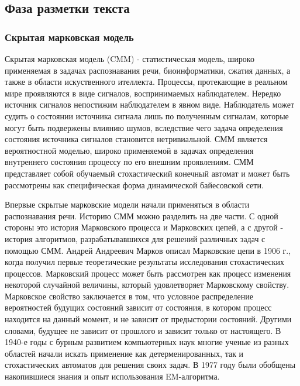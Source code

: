 \subsection{Фаза разметки текста}

\subsubsection{Скрытая марковская модель}
Скрытая марковская модель (CMM) - статистическая модель, широко применяемая в задачах распознавания речи, биоинформатики, сжатия данных, а также в области искуственного ителлекта. Процессы, протекающие в реальном мире проявляются в виде сигналов, воспринимаемых наблюдателем. Нередко источник сигналов непостижим наблюдателем в явном виде. Наблюдатель может судить о состоянии источника сигнала лишь по полученным сигналам, которые могут быть подвержены влиянию шумов, вследствие чего задача определения состояния источника сигналов становится нетривиальной. СММ является вероятностной моделью, широко применяемой в задачах определения внутреннего состояния процессу по его внешним проявлениям. СММ представляет собой обучаемый стохастический конечный автомат и может быть рассмотрены как специфическая форма динамической байесовской сети.

Впервые скрытые марковские модели начали применяться в области распознавания речи. Историю СММ можно разделить на две части.\cite{kouemou} С одной стороны это история Марковского процесса и Марковских цепей, а с другой - история алгоритмов, разрабатывавшихся для решений различных задач с помощью СММ. Андрей Андреевич Марков описал Марковские цепи в 1906 г., когда получил первые теоретические результаты исследования стохастических процессов. Марковский процесс может быть рассмотрен как процесс изменения некоторой случайной величины, который удовлетворяет Марковскому свойству. Марковское свойство заключается в том, что условное распределение вероятностей будущих состояний зависит от состояния, в котором процесс находится на данный момент, и не зависит от предыстории состояний. Другими словами, будущее не зависит от прошлого и зависит только от настоящего. В 1940-е годы с бурным развитием компьютерных наук многие ученые из разных областей начали искать применение как детерменированных, так и стохастических автоматов для решения своих задач. В 1977 году были обобщены накопившиеся знания и опыт использования EM-алгоритма\cite{dempster1977maximum}. 

